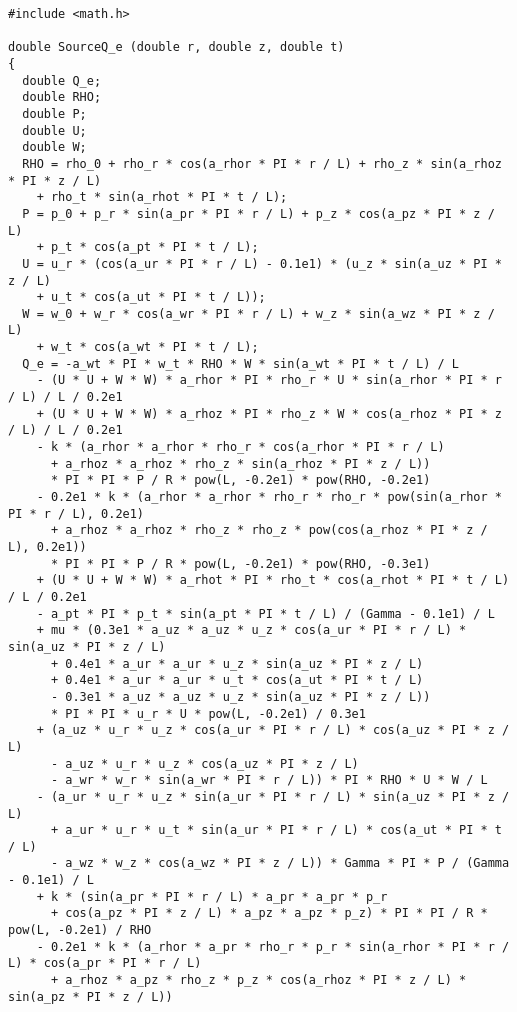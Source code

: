 \documentclass[10pt]{article}
\begin{document}
\begin{small}
\begin{verbatim}#include <math.h>

double SourceQ_e (double r, double z, double t)
{
  double Q_e;
  double RHO;
  double P;
  double U;
  double W;
  RHO = rho_0 + rho_r * cos(a_rhor * PI * r / L) + rho_z * sin(a_rhoz * PI * z / L)
    + rho_t * sin(a_rhot * PI * t / L);
  P = p_0 + p_r * sin(a_pr * PI * r / L) + p_z * cos(a_pz * PI * z / L)
    + p_t * cos(a_pt * PI * t / L);
  U = u_r * (cos(a_ur * PI * r / L) - 0.1e1) * (u_z * sin(a_uz * PI * z / L)
    + u_t * cos(a_ut * PI * t / L));
  W = w_0 + w_r * cos(a_wr * PI * r / L) + w_z * sin(a_wz * PI * z / L)
    + w_t * cos(a_wt * PI * t / L);
  Q_e = -a_wt * PI * w_t * RHO * W * sin(a_wt * PI * t / L) / L
    - (U * U + W * W) * a_rhor * PI * rho_r * U * sin(a_rhor * PI * r / L) / L / 0.2e1
    + (U * U + W * W) * a_rhoz * PI * rho_z * W * cos(a_rhoz * PI * z / L) / L / 0.2e1
    - k * (a_rhor * a_rhor * rho_r * cos(a_rhor * PI * r / L)
      + a_rhoz * a_rhoz * rho_z * sin(a_rhoz * PI * z / L))
      * PI * PI * P / R * pow(L, -0.2e1) * pow(RHO, -0.2e1)
    - 0.2e1 * k * (a_rhor * a_rhor * rho_r * rho_r * pow(sin(a_rhor * PI * r / L), 0.2e1)
      + a_rhoz * a_rhoz * rho_z * rho_z * pow(cos(a_rhoz * PI * z / L), 0.2e1))
      * PI * PI * P / R * pow(L, -0.2e1) * pow(RHO, -0.3e1)
    + (U * U + W * W) * a_rhot * PI * rho_t * cos(a_rhot * PI * t / L) / L / 0.2e1
    - a_pt * PI * p_t * sin(a_pt * PI * t / L) / (Gamma - 0.1e1) / L
    + mu * (0.3e1 * a_uz * a_uz * u_z * cos(a_ur * PI * r / L) * sin(a_uz * PI * z / L)
      + 0.4e1 * a_ur * a_ur * u_z * sin(a_uz * PI * z / L)
      + 0.4e1 * a_ur * a_ur * u_t * cos(a_ut * PI * t / L)
      - 0.3e1 * a_uz * a_uz * u_z * sin(a_uz * PI * z / L))
      * PI * PI * u_r * U * pow(L, -0.2e1) / 0.3e1
    + (a_uz * u_r * u_z * cos(a_ur * PI * r / L) * cos(a_uz * PI * z / L)
      - a_uz * u_r * u_z * cos(a_uz * PI * z / L)
      - a_wr * w_r * sin(a_wr * PI * r / L)) * PI * RHO * U * W / L
    - (a_ur * u_r * u_z * sin(a_ur * PI * r / L) * sin(a_uz * PI * z / L)
      + a_ur * u_r * u_t * sin(a_ur * PI * r / L) * cos(a_ut * PI * t / L)
      - a_wz * w_z * cos(a_wz * PI * z / L)) * Gamma * PI * P / (Gamma - 0.1e1) / L
    + k * (sin(a_pr * PI * r / L) * a_pr * a_pr * p_r
      + cos(a_pz * PI * z / L) * a_pz * a_pz * p_z) * PI * PI / R * pow(L, -0.2e1) / RHO
    - 0.2e1 * k * (a_rhor * a_pr * rho_r * p_r * sin(a_rhor * PI * r / L) * cos(a_pr * PI * r / L)
      + a_rhoz * a_pz * rho_z * p_z * cos(a_rhoz * PI * z / L) * sin(a_pz * PI * z / L))

\end{verbatim}
\end{small}
\end{document}
